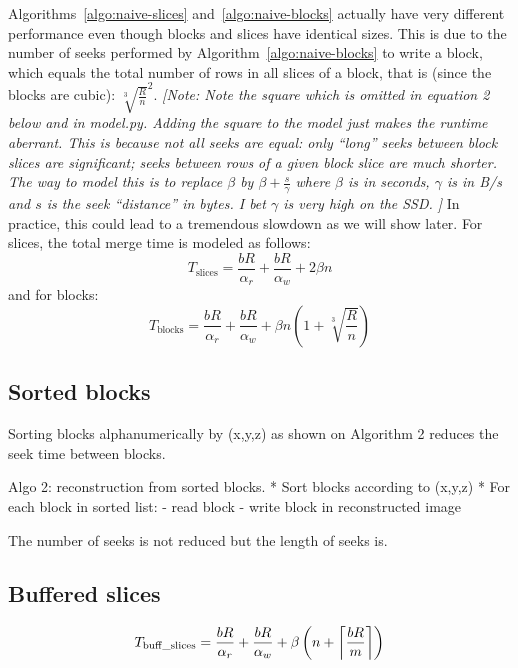 \documentclass[10pt, conference, compsocconf]{IEEEtran}
\DeclarePairedDelimiter{\ceil}{\lceil}{\rceil}
\newcommand{\note}[1]{
  \color{blue}\emph{[Note: #1]}
  \color{black}
}
\begin{document}
Algorithms~\ref{algo:naive-slices} and~\ref{algo:naive-blocks}
actually have very different performance even though blocks and slices
have identical sizes. This is due to the number of seeks performed by
Algorithm~\ref{algo:naive-blocks} to write a block, which equals the
total number of rows in all slices of a block, that is (since the
blocks are cubic): $\sqrt[3]{\frac{R}{n}}^2$. \note{Note the square
  which is omitted in equation 2 below and in model.py. Adding the
  square to the model just makes the runtime aberrant. This is because
  not all seeks are equal: only ``long'' seeks between block slices
  are significant; seeks between rows of a given block slice are much
  shorter. The way to model this is to replace $\beta$ by $\beta +
  \frac{s}{\gamma}$ where $\beta$ is in seconds, $\gamma$ is in B/s
  and $s$ is the seek ``distance'' in bytes. I bet $\gamma$ is very
  high on the SSD. } In practice, this could lead to a tremendous
slowdown as we will show later. For slices, the total merge time is
modeled as follows:
\begin{equation}
T_\mathrm{slices} = \frac{bR}{\alpha_r}+\frac{bR}{\alpha_w}+2\beta n
\end{equation}
and for blocks:
\begin{equation}
  T_\mathrm{blocks} = \frac{bR}{\alpha_r}+\frac{bR}{\alpha_w}+\beta n\left(1+\sqrt[3]{\frac{R}{n}}\right)
\end{equation}

\subsection{Sorted blocks}

Sorting blocks alphanumerically by (x,y,z) as shown on Algorithm 2 reduces the seek time
between blocks.

Algo 2: reconstruction from sorted blocks.
* Sort blocks according to (x,y,z)
* For each block in sorted list:
  - read block
  - write block in reconstructed image

The number of seeks is not reduced but the length of seeks is.

\subsection{Buffered slices}

\begin{equation}
T_\mathrm{buff\_slices} = \frac{bR}{\alpha_r}+\frac{bR}{\alpha_w}+\beta\left( n + \ceil*{\frac{bR}{m}}\right)
\end{equation}
\end{document}
